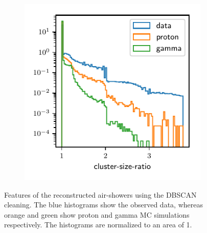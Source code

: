 \begin{figure}
\begin{subfigure}{0.5\textwidth}
  \end{subfigure}
  \begin{subfigure}{0.5\textwidth}
    \centering
    \includegraphics[width=\textwidth, page=8]{Plots/data_mc/features_DBSCAN.pdf}
  \end{subfigure}
  \caption{Features of the reconstructed air-showers using the DBSCAN cleaning. The blue histograms show the observed data, whereas orange and green show proton and gamma MC simulations respectively. The histograms are normalized to an area of \num{1}.}
  \label{fig:feat_dbscan}
\end{figure}
%
%
